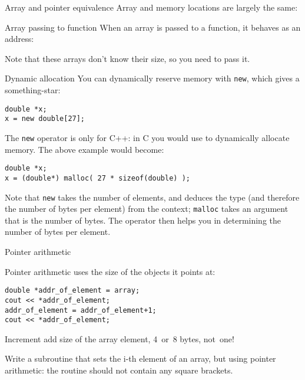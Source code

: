 \begin{block}{Array and pointer equivalence}
  \label{sl:array-pointer}
  Array and memory locations are largely the same:
\end{block}

\begin{block}{Array passing to function}
  \label{sl:array-function}
  When an array is passed to a function,
  it behaves as an address:

  Note that these arrays don't know their size, so
  you need to pass it.
\end{block}

\begin{block}{Dynamic allocation}
  \label{sl:newstar}
  You can dynamically reserve memory with \lstinline{new}, which gives
  a something-star:
\begin{lstlisting}
double *x;
x = new double[27];
\end{lstlisting}
\end{block}

The \lstinline{new} operator is only for C++: 
in C you would use   to dynamically allocate memory.
The above example would become:
\begin{lstlisting}
double *x;
x = (double*) malloc( 27 * sizeof(double) );
\end{lstlisting}
Note that \lstinline{new} takes the number of elements, and deduces
the type (and therefore the number of bytes per element) from the
context; \lstinline{malloc} takes an argument that is the number of
bytes. The  operator then helps you in
determining the number of bytes per element.

 {Pointer arithmetic}

\begin{block}{Pointer arithmetic}
   uses the size of the objects it
  points at:
\begin{lstlisting}
double *addr_of_element = array;
cout << *addr_of_element;
addr_of_element = addr_of_element+1;
cout << *addr_of_element;
\end{lstlisting}
Increment add size of the array element, 4~or~8 bytes, not~one!
\end{block}

\begin{exercise}
  Write a subroutine that sets the i-th element of an array, but using
  pointer arithmetic: the routine should not contain any square brackets.
\end{exercise}

